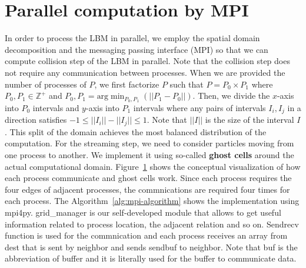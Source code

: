 \section{Parallel computation by MPI}
In order to process the LBM in parallel,
we employ the spatial domain decomposition and
the messaging passing interface (MPI)
so that we can compute collision step of the LBM
in parallel.
Note that the collision step does not require
any communication between processes.
When we are provided the number of processes of $P$,
we first factorize $P$ such that $P = P_0 \times P_1$
where $P_0, P_1 \in \mathbb{Z}^{+}$
and $P_0, P_1 = \text{arg} \min_{P_0, P_1}(|| P_1 - P_0 ||)$.
Then, we divide the $x$-axis into $P_0$ intervals and
$y$-axis into $P_1$ intervals where
any pairs of intervals $I_{i}, I_{j}$ in a direction satisfies
$-1 \leq || I_{i} || - ||I_{j}|| \leq 1$.
Note that $||I||$ is the size of the interval $I$.
This split of the domain achieves the most balanced distribution of
the computation.
For the streaming step, we need to consider particles
moving from one process to another.
We implement it using so-called {\bf ghost cells}
around the actual computational domain.
Figure~\ref{} shows the conceptual visualization of
how each process communicate and ghost cells work.
Since each process requires the four edges of adjacent
processes, the commnications are required four times
for each process.
The Algorithm~\ref{alg:mpi-algorithm}
shows the implementation using mpi4py.
grid\_manager is our self-developed module
that allows to get useful information related to
process location, the adjacent relation and so on.
Sendrecv function is used for the commnication and
each process receives an array from dest that is sent
by neighbor and sends sendbuf to neighbor.
Note that buf is the abbreviation of buffer and
it is literally used for the buffer to communicate data.


